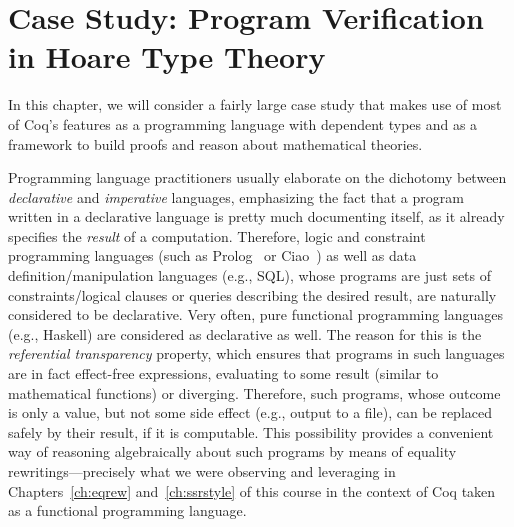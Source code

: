 \begin{coqdoccode}
\coqdocemptyline
\coqdocemptyline
\end{coqdoccode}

\chapter{Case Study: Program Verification in Hoare Type Theory}
\label{ch:htt}
 



In this chapter, we will consider a fairly large case study that makes
use of most of Coq's features as a programming language with dependent
types and as a framework to build proofs and reason about mathematical
theories.




Programming language practitioners usually elaborate on the dichotomy
between \textit{declarative} and \textit{imperative} languages, emphasizing the fact
that a program written in a declarative language is pretty much
documenting itself, as it already specifies the \textit{result} of a
computation. Therefore, logic and constraint programming languages
(such as Prolog~\cite{Lloyd:87}  or
Ciao~\cite{Hermenegildo-al:TPLP12}) as well as data
definition/manipulation languages (e.g., SQL), whose programs are just
sets of constraints/logical clauses or queries describing the desired
result, are naturally considered to be declarative. Very often, pure
functional programming languages (e.g., Haskell) are considered as
declarative as well. The reason for this is the \textit{referential
transparency} property, which ensures that programs in such languages
 are in fact effect-free
expressions, evaluating to some result (similar to mathematical
functions) or diverging. Therefore, such programs, whose outcome is
only a value, but not some side effect (e.g., output to a file), can
be replaced safely by their result, if it is computable. This
possibility provides a convenient way of reasoning algebraically about
such programs by means of equality rewritings---precisely what we were
observing and leveraging in Chapters~\ref{ch:eqrew}
and~\ref{ch:ssrstyle} of this course in the context of Coq taken as a
functional programming language.




